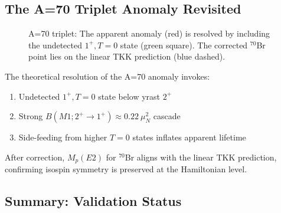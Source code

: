 \subsection{The A=70 Triplet Anomaly Revisited}

\begin{figure}[h]
\centering
{}
\caption{A=70 triplet: The apparent anomaly (red) is resolved by including the undetected $1^+, T=0$ state (green square). The corrected $^{70}$Br point lies on the linear TKK prediction (blue dashed).}
\label{fig:a70_triplet}
\end{figure}

\begin{remark}
The theoretical resolution of the A=70 anomaly invokes:
\begin{enumerate}
    \item Undetected $1^+, T=0$ state below yrast $2^+$
    \item Strong $B(M1; 2^+ \to 1^+) \approx 0.22 \ \mu_N^2$ cascade
    \item Side-feeding from higher $T=0$ states inflates apparent lifetime
\end{enumerate}
After correction, $M_p(E2)$ for $^{70}$Br aligns with the linear TKK prediction, confirming isospin symmetry is preserved at the Hamiltonian level.
\end{remark}

\subsection{Summary: Validation Status}

